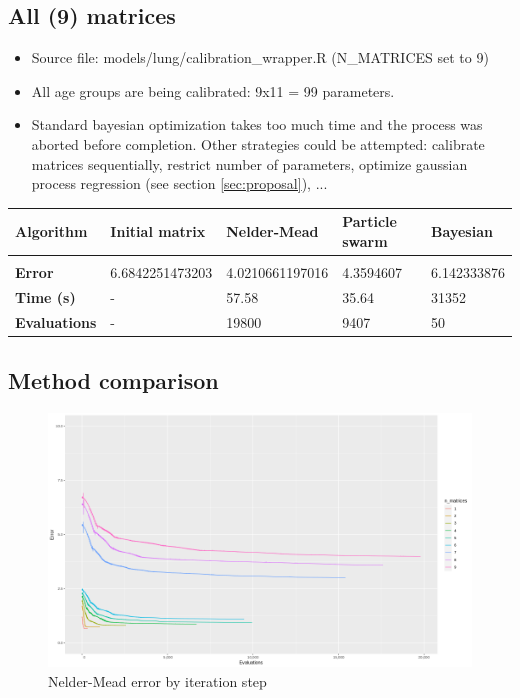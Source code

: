 \subsection{All (9) matrices}

\begin{itemize}
    \item Source file: models/lung/calibration\_wrapper.R (N\_MATRICES set to 9)
	\item All age groups are being calibrated: 9x11 = 99 parameters.
	\item Standard bayesian optimization takes too much time and the process was aborted before completion. Other strategies could be attempted: calibrate matrices sequentially, restrict number of parameters, optimize gaussian process regression (see section \ref{sec:proposal}), ...
\end{itemize}

\begin{table}[h]
	\begin{tabular}{p{2cm}|l|l|l|l}
		\textbf{Algorithm} 		& \textbf{Initial matrix} & \textbf{Nelder-Mead} 		& \textbf{Particle swarm} 	& \textbf{Bayesian} \\
		\hline \\
		\textbf{Error}	& 6.6842251473203 & 4.0210661197016	& 4.3594607 & \cellcolor{red}6.142333876 \\
		\textbf{Time (s)} & - & 57.58 & 35.64 & \cellcolor{red}31352 \\
		\textbf{Evaluations} & - & 19800 & 9407 & \cellcolor{red}50 \\
	\end{tabular}
\end{table}

\subsection{Method comparison}

\begin{figure}[!htb]
	\centering
	\includegraphics[width=\textwidth]{figures/alg_nelder-mead}
	\decoRule
	\caption[Nelder-Mead]{Nelder-Mead error by iteration step}
	\label{fig:alg_nelder-mead}
\end{figure}

